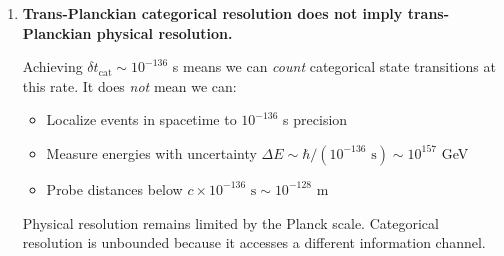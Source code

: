 \documentclass[twocolumn,10pt]{article}
\theoremstyle{remark}
\begin{document}
\begin{enumerate}
    Both measure rotation rate, but the categorical method scales indefinitely by increasing marking density, without increasing photon energy.
    
    \item \textbf{Trans-Planckian categorical resolution does not imply trans-Planckian physical resolution.}
    
    Achieving $\delta t_{\text{cat}} \sim 10^{-136}$ s means we can \textit{count} categorical state transitions at this rate. It does \textit{not} mean we can:
    \begin{itemize}
        \item Localize events in spacetime to $10^{-136}$ s precision
        \item Measure energies with uncertainty $\Delta E \sim \hbar/(10^{-136} \text{ s}) \sim 10^{157}$ GeV
        \item Probe distances below $c \times 10^{-136} \text{ s} \sim 10^{-128}$ m
    \end{itemize}
    
    Physical resolution remains limited by the Planck scale. Categorical resolution is unbounded because it accesses a different information channel.
\end{enumerate}
\end{document}
